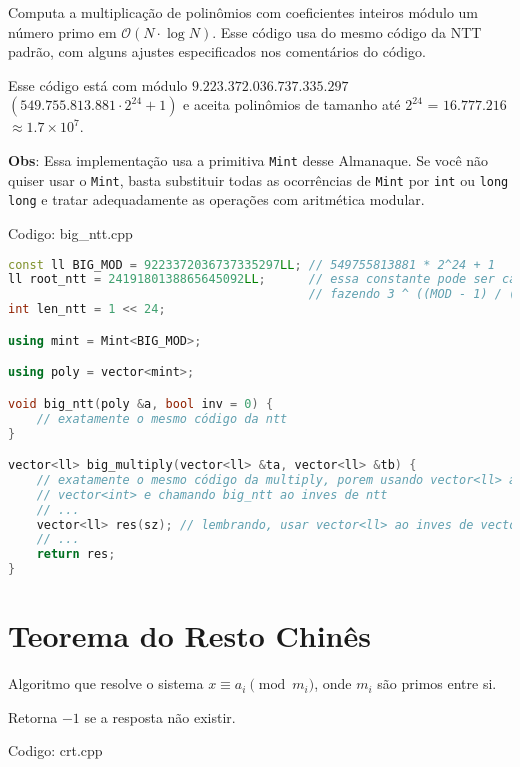 \documentclass[10pt, a4paper, oneside]{book}
\begin{document}
Computa a multiplicação de polinômios com coeficientes inteiros módulo um número primo em $\mathcal{O}(N \cdot \log N)$. Esse código usa do mesmo código da NTT padrão, com alguns ajustes especificados nos comentários do código.



Esse código está com módulo $9.223.372.036.737.335.297$ $(549.755.813.881 \cdot 2^{24} + 1)$ e aceita polinômios de tamanho até $2^{24}$ = $16.777.216$ $\approx 1.7 \times 10^7$.



\textbf{Obs}: Essa implementação usa a primitiva \texttt{Mint} desse Almanaque. Se você não quiser usar o \texttt{Mint}, basta substituir todas as ocorrências de \texttt{Mint} por \texttt{int} ou \texttt{long long} e tratar adequadamente as operações com aritmética modular.
\hfill

Codigo: big\_ntt.cpp

\begin{lstlisting}[language=C++]
const ll BIG_MOD = 9223372036737335297LL; // 549755813881 * 2^24 + 1
ll root_ntt = 2419180138865645092LL;      // essa constante pode ser calculada
                                          // fazendo 3 ^ ((MOD - 1) / (1 << 24))
int len_ntt = 1 << 24;

using mint = Mint<BIG_MOD>;

using poly = vector<mint>;

void big_ntt(poly &a, bool inv = 0) {
    // exatamente o mesmo código da ntt
}

vector<ll> big_multiply(vector<ll> &ta, vector<ll> &tb) {
    // exatamente o mesmo código da multiply, porem usando vector<ll> ao inves de
    // vector<int> e chamando big_ntt ao inves de ntt
    // ...
    vector<ll> res(sz); // lembrando, usar vector<ll> ao inves de vector<int>
    // ...
    return res;
}\end{lstlisting}
\hfill

\section{Teorema do Resto Chinês}


Algoritmo que resolve o sistema $x \equiv a_i \pmod{m_i}$, onde $m_i$ são primos entre si.



Retorna $-1$ se a resposta não existir.

\hfill

Codigo: crt.cpp
\end{document}
